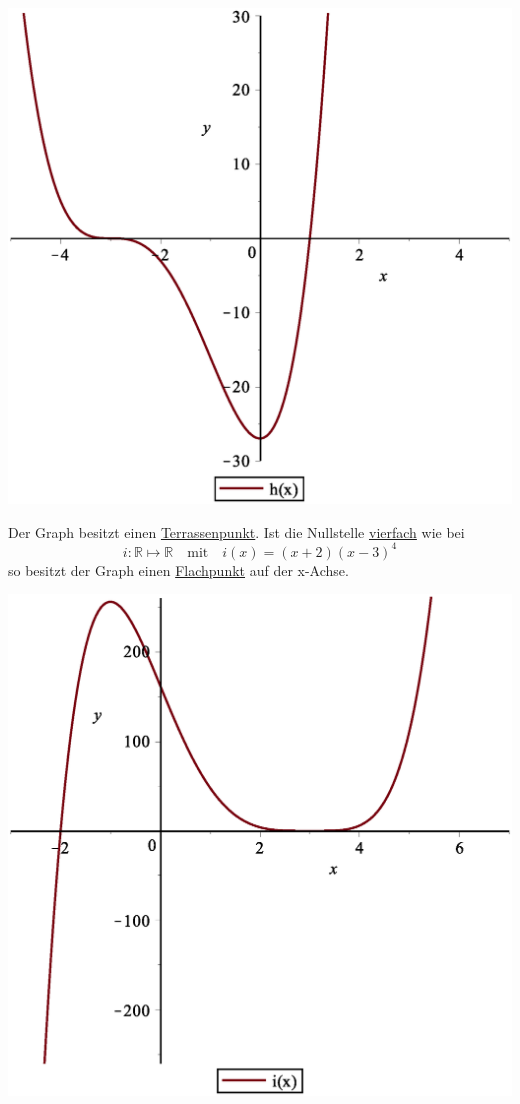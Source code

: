 \documentclass{report}
\begin{document}
\begin{center}
\includegraphics[scale=0.3]{images/ganzrationale_funkt_h.eps}
\end{center}
Der Graph besitzt einen \underline{Terrassenpunkt}. Ist die Nullstelle \underline{vierfach} wie bei
\begin{equation}i: \mathbb{R} \mapsto \mathbb{R} \quad \mbox{mit} \quad i(x) = (x+2)(x-3)^4\end{equation}
so besitzt der Graph einen \underline{Flachpunkt} auf der x-Achse.
\begin{center}
\includegraphics[scale=0.3]{images/ganzrationale_funkt_i.eps}
\end{center}
\end{document}
